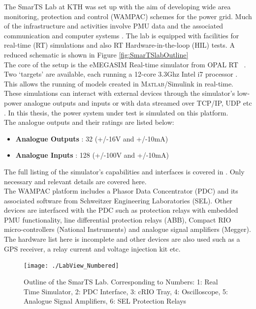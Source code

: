\documentclass[journal]{IEEEtran}
\begin{document}
The SmarTS Lab at KTH was set up with the aim of developing wide area monitoring, protection and control (WAMPAC) schemes for the power grid. Much of the infrastructure and activities involve PMU data and the associated communication and computer systems  \cite{SmarTSLab}. The lab is equipped with facilities for real-time (RT) simulations and also RT Hardware-in-the-loop (HIL) tests. A reduced schematic is shown in Figure \ref{fig:SmarTSlabOutline}\\

The core of the setup is the eMEGASIM Real-time simulator from OPAL RT ~\cite{eMEGASIM}. Two \textquoteleft targets' are available,  each running a 12-core 3.3Ghz Intel i7 processor \cite{SmarTSLab}. This allows the running of models created in \textsc{Matlab}/Simulink in real-time. These simulations can interact with external devices through the simulator's low-power analogue outputs and inputs or with data streamed over TCP/IP, UDP etc \cite{SmarTSLab}. In this thesis, the power system under test is simulated on this platform.\\

The analogue outputs and their ratings are listed below:\label{OPALlimits}

\begin{itemize}
\item \textbf{Analogue Outputs} : 32 (+/-16V and +/-10mA)
\item \textbf{Analogue Inputs} : 128 (+/-100V and +/-10mA)
\end{itemize}

The full listing of the simulator's capabilities and interfaces is covered in \cite{SmarTSLab}. Only necessary and relevant details are covered here.\\

The WAMPAC platform includes a Phasor Data Concentrator (PDC) and its associated software from Schweitzer Engineering Laboratories (SEL). Other devices are interfaced with the PDC such as protection relays with embedded PMU functionality, line differential protection relays (ABB), Compact RIO micro-controllers (National Instruments) and analogue signal amplifiers (Megger)\cite{SmarTSLab}. The hardware list here is incomplete and other devices are also used such as a GPS receiver, a relay current and voltage injection kit etc.\\

\begin{figure}[!t]\label{SetupImage}
\centering
\texttt{[image: ./LabView\_Numbered]}
\caption{Outline of the SmarTS Lab. Corresponding to Numbers: 1: Real Time Simulator, 2: PDC Interface, 3: cRIO Tray, 4: Oscilloscope, 5: Analogue Signal Amplifiers, 6: SEL Protection Relays}
\label{fig:LabView_Numbered}
\end{figure}
\end{document}
